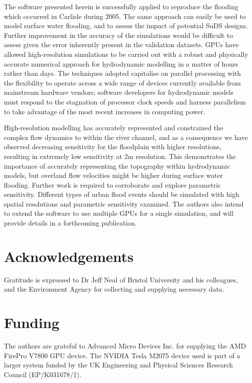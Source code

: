 \documentclass[11pt,english,a4paper]{article}
\begin{document}
The software presented herein is successfully applied to reproduce the flooding which occurred in Carlisle during 2005. The same approach can easily be used to model surface water flooding, and to assess the impact of potential SuDS designs. Further improvement in the accuracy of the simulations would be difficult to assess given the error inherently present in the validation datasets. GPUs have allowed high-resolution simulations to be carried out with a robust and physically accurate numerical approach for hydrodynamic modelling in a matter of hours rather than days. The techniques adopted capitalise on parallel processing with the flexibility to operate across a wide range of devices currently available from mainstream hardware vendors; software developers for hydrodynamic models must respond to the stagnation of processor clock speeds and harness parallelism to take advantage of the most recent increases in computing power. 

High-resolution modelling has accurately represented and constrained the complex flow dynamics to within the river channel, and as a consequence we have observed decreasing sensitivity for the floodplain with higher resolutions, resulting in extremely low sensitivity at 2m resolution. This demonstrates the importance of accurately representing the topography within hydrodynamic models, but overland flow velocities might be higher during surface water flooding. Further work is required to corroborate and explore parametric sensitivity. Different types of urban flood events should be simulated with high spatial resolutions and parametric sensitivity examined. The authors also intend to extend the software to use multiple GPUs for a single simulation, and will provide details in a forthcoming publication.

\section*{Acknowledgements}
Gratitude is expressed to Dr Jeff Neal of Bristol University and his colleagues, and the Environment Agency for collecting and supplying necessary data.

\section*{Funding}
The authors are grateful to Advanced Micro Devices Inc. for supplying the AMD FirePro V7800 GPU device. The NVIDIA Tesla M2075 device used is part of a larger system funded by the UK Engineering and Physical Sciences Research Council (EP/K031678/1).



\end{document}
